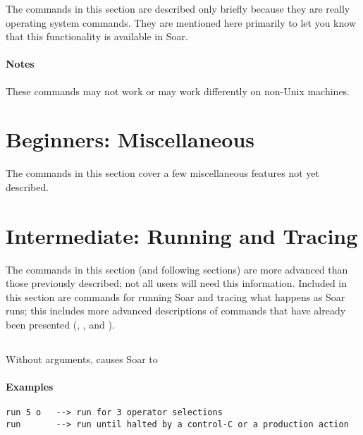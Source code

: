 {The commands in this section are described only briefly because they are
really operating system commands. They are mentioned here primarily to let you
know that this functionality is available in Soar.

\paragraph{Notes}

These commands may not work or may work differently on non-Unix machines.


\section{Beginners: Miscellaneous}

The commands in this section cover a few miscellaneous features not yet
described. 

\section{Intermediate: Running and Tracing}

The commands in this section (and following sections) are more advanced than
those previously described; not all users will need this information. Included
in this section are commands for running Soar and tracing what happens as Soar
runs; this includes more advanced descriptions of commands that have already
been presented (, , and ).

\subsection{}
\label{run2}


Without arguments,  causes Soar to 

\paragraph{Examples}
\begin{verbatim}
run 5 o   --> run for 3 operator selections
run       --> run until halted by a control-C or a production action
\end{verbatim}

}
